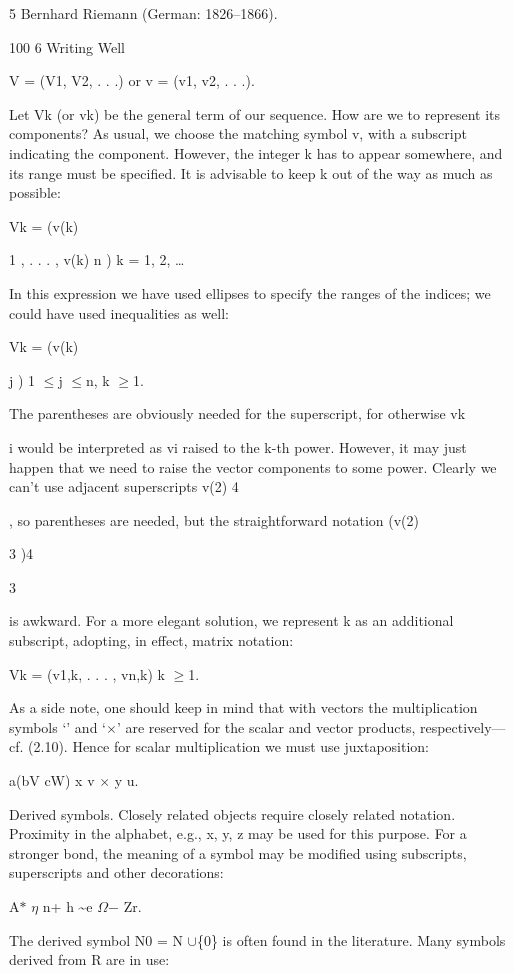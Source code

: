 \documentclass[11pt]{article}
\theoremstyle{plain}
\theoremstyle{definition}
\begin{document}
5 Bernhard Riemann (German: 1826--1866).

100 6 Writing Well

V = (V1, V2, . . .) or v = (v1, v2, . . .).

Let Vk (or vk) be the general term of our sequence. How are we to represent its components? As usual, we choose the matching symbol v, with a subscript indicating the component. However, the integer k has to appear somewhere, and its range must be specified. It is advisable to keep k out of the way as much as possible:

Vk = (v(k)

1 , . . . , v(k) n ) k = 1, 2, \dots{}

In this expression we have used ellipses to specify the ranges of the indices; we could have used inequalities as well:

Vk = (v(k)

j ) 1 $\leq$j $\leq$n, k $\geq$1.

The parentheses are obviously needed for the superscript, for otherwise vk

i would be interpreted as vi raised to the k-th power. However, it may just happen that we need to raise the vector components to some power. Clearly we can't use adjacent superscripts v(2) 4

, so parentheses are needed, but the straightforward notation (v(2)

3 )4

3

is awkward. For a more elegant solution, we represent k as an additional subscript, adopting, in effect, matrix notation:

Vk = (v1,k, . . . , vn,k) k $\geq$1.

As a side note, one should keep in mind that with vectors the multiplication symbols `\textperiodcentered{}' and `$\times$' are reserved for the scalar and vector products, respectively---cf. (2.10). Hence for scalar multiplication we must use juxtaposition:

a(bV \textperiodcentered{} cW) x v $\times$ y u.

Derived symbols. Closely related objects require closely related notation. Proximity in the alphabet, e.g., x, y, z may be used for this purpose. For a stronger bond, the meaning of a symbol may be modified using subscripts, superscripts and other decorations:

A$*$ $\eta$ n+ h \textasciitilde{}e $\Omega$$-$ Zr.

The derived symbol N0 = N $\cup$\{0\} is often found in the literature. Many symbols derived from R are in use:
\end{document}
